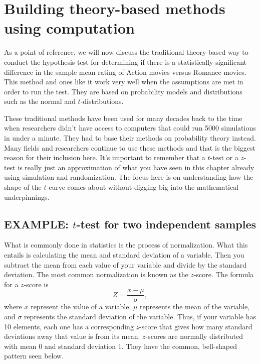 \documentclass[]{tufte-book}
\begin{document}
\section{Building theory-based methods using
computation}\label{theory-hypo}

As a point of reference, we will now discuss the traditional
theory-based way to conduct the hypothesis test for determining if there
is a statistically significant difference in the sample mean rating of
Action movies versus Romance movies. This method and ones like it work
very well when the assumptions are met in order to run the test. They
are based on probability models and distributions such as the normal and
\(t\)-distributions.

These traditional methods have been used for many decades back to the
time when researchers didn't have access to computers that could run
5000 simulations in under a minute. They had to base their methods on
probability theory instead. Many fields and researchers continue to use
these methods and that is the biggest reason for their inclusion here.
It's important to remember that a \(t\)-test or a \(z\)-test is really
just an approximation of what you have seen in this chapter already
using simulation and randomization. The focus here is on understanding
how the shape of the \(t\)-curve comes about without digging big into
the mathematical underpinnings.

\subsection{\texorpdfstring{EXAMPLE: \(t\)-test for two independent
samples}{EXAMPLE: t-test for two independent samples}}\label{example-t-test-for-two-independent-samples}

What is commonly done in statistics is the process of normalization.
What this entails is calculating the mean and standard deviation of a
variable. Then you subtract the mean from each value of your variable
and divide by the standard deviation. The most common normalization is
known as the \(z\)-score. The formula for a \(z\)-score is
\[Z = \frac{x - \mu}{\sigma},\] where \(x\) represent the value of a
variable, \(\mu\) represents the mean of the variable, and \(\sigma\)
represents the standard deviation of the variable. Thus, if your
variable has 10 elements, each one has a corresponding \(z\)-score that
gives how many standard deviations away that value is from its mean.
\(z\)-scores are normally distributed with mean 0 and standard deviation
1. They have the common, bell-shaped pattern seen below.
\end{document}
